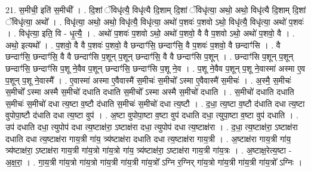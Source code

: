 \documentclass[17pt]{extarticle}
\begin{document}
21. स॒मीची॒ इति॑ स॒मीची᳚ । . दि॒शां ॅविधृ॑त्यै॒ विधृ॑त्यै दि॒शाम् दि॒शां ॅविधृ॑त्या॒ अथो॒ अथो॒ विधृ॑त्यै दि॒शाम् दि॒शां ॅविधृ॑त्या॒ अथो᳚ । . विधृ॑त्या॒ अथो॒ अथो॒ विधृ॑त्यै॒ विधृ॑त्या॒ अथो॑ प॒शवः॑ प॒शवो ऽथो॒ विधृ॑त्यै॒ विधृ॑त्या॒ अथो॑ प॒शवः॑ । . विधृ॑त्या॒ इति॒ वि - धृ॒त्यै॒ । . अथो॑ प॒शवः॑ प॒शवो ऽथो॒ अथो॑ प॒शवो॒ वै वै प॒शवो ऽथो॒ अथो॑ प॒शवो॒ वै । . अथो॒ इत्यथो᳚ । . प॒शवो॒ वै वै प॒शवः॑ प॒शवो॒ वै छन्दाꣳ॑सि॒ छन्दाꣳ॑सि॒ वै प॒शवः॑ प॒शवो॒ वै छन्दाꣳ॑सि । . वै छन्दाꣳ॑सि॒ छन्दाꣳ॑सि॒ वै वै छन्दाꣳ॑सि प॒शून् प॒शून् छन्दाꣳ॑सि॒ वै वै छन्दाꣳ॑सि प॒शून् । . छन्दाꣳ॑सि प॒शून् प॒शून् छन्दाꣳ॑सि॒ छन्दाꣳ॑सि प॒शू ने॒वैव प॒शून् छन्दाꣳ॑सि॒ छन्दाꣳ॑सि प॒शू ने॒व । . प॒शू ने॒वैव प॒शून् प॒शू ने॒वास्मा॑ अस्मा ए॒व प॒शून् प॒शू ने॒वास्मै᳚ । . ए॒वास्मा॑ अस्मा ए॒वैवास्मै॑ स॒मीचः॑ स॒मीचो᳚ ऽस्मा ए॒वैवास्मै॑ स॒मीचः॑ । . अ॒स्मै॒ स॒मीचः॑ स॒मीचो᳚ ऽस्मा अस्मै स॒मीचो॑ दधाति दधाति स॒मीचो᳚ ऽस्मा अस्मै स॒मीचो॑ दधाति । . स॒मीचो॑ दधाति दधाति स॒मीचः॑ स॒मीचो॑ दधा त्य॒ष्टा व॒ष्टौ द॑धाति स॒मीचः॑ स॒मीचो॑ दधा त्य॒ष्टौ । . द॒धा॒ त्य॒ष्टा व॒ष्टौ द॑धाति दधा त्य॒ष्टा वुपोपा॒ष्टौ द॑धाति दधा त्य॒ष्टा वुप॑ । . अ॒ष्टा वुपोपा॒ष्टा व॒ष्टा वुप॑ दधाति दधा॒ त्युपा॒ष्टा व॒ष्टा वुप॑ दधाति । . उप॑ दधाति दधा॒ त्युपोप॑ दधा त्य॒ष्टाक्ष॑रा॒ ऽष्टाक्ष॑रा दधा॒ त्युपोप॑ दधा त्य॒ष्टाक्ष॑रा । . द॒धा॒ त्य॒ष्टाक्ष॑रा॒ ऽष्टाक्ष॑रा दधाति दधा त्य॒ष्टाक्ष॑रा गाय॒त्री गा॑य॒ त्र्य॑ष्टाक्ष॑रा दधाति दधा त्य॒ष्टाक्ष॑रा गाय॒त्री । . अ॒ष्टाक्ष॑रा गाय॒त्री गा॑य॒ त्र्य॑ष्टाक्ष॑रा॒ ऽष्टाक्ष॑रा गाय॒त्री गा॑य॒त्रो गा॑य॒त्रो गा॑य॒ त्र्य॑ष्टाक्ष॑रा॒ ऽष्टाक्ष॑रा गाय॒त्री गा॑य॒त्रः । . अ॒ष्टाक्ष॒रेत्य॒ष्टा - अ॒क्ष॒रा॒ । . गा॒य॒त्री गा॑य॒त्रो गा॑य॒त्रो गा॑य॒त्री गा॑य॒त्री गा॑य॒त्रो᳚ ऽग्नि र॒ग्निर् गा॑य॒त्रो गा॑य॒त्री गा॑य॒त्री गा॑य॒त्रो᳚ ऽग्निः । \newline
\end{document}
